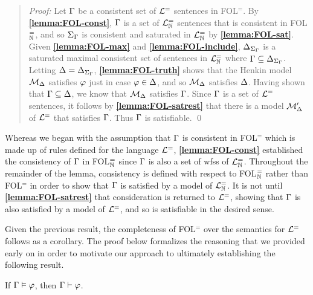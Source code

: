 \begin{quote} 
  \textit{Proof:} 
  Let $\Gamma$ be a consistent set of $\mathcal{L}^{=}$ sentences in FOL$^=$.
  By \textbf{\ref{lemma:FOL-const}}, $\Gamma$ is a set of $\mathcal{L}^{=}_{\mathbb{N}}$ sentences that is consistent in FOL$^=_{\mathbb{N}}$, and so $\Sigma_{\Gamma}$ is consistent and saturated in $\mathcal{L}^{=}_{\mathbb{N}}$ by \textbf{\ref{lemma:FOL-sat}}. 
  Given \textbf{\ref{lemma:FOL-max}} and \textbf{\ref{lemma:FOL-include}}, $\Delta_{\Sigma_{\Gamma}}$ is a saturated maximal consistent set of sentences in $\mathcal{L}^{=}_{\mathbb{N}}$ where $\Gamma\subseteq\Delta_{\Sigma_{\Gamma}}$.
  Letting $\Delta=\Delta_{\Sigma_{\Gamma}}$, \textbf{\ref{lemma:FOL-truth}} shows that the Henkin model $\mathcal{M}_{\Delta}$ satisfies $\varphi$ just in case $\varphi\in\Delta$, and so $\mathcal{M}_{\Delta}$ satisfies $\Delta$.
  Having shown that $\Gamma\subseteq\Delta$, we know that $\mathcal{M}_{\Delta}$ satisfies $\Gamma$.
  Since $\Gamma$ is a set of $\mathcal{L}^{=}$ sentences, it follows by \textbf{\ref{lemma:FOL-satrest}} that there is a model $\mathcal{M}'_{\Delta}$ of $\mathcal{L}^{=}$ that satisfies $\Gamma$.
  Thus $\Gamma$ is satisfiable.
  \qed
\end{quote}

Whereas we began with the assumption that $\Gamma$ is consistent in FOL$^=$ which is made up of rules defined for the language $\mathcal{L}^{=}$, \textbf{\ref{lemma:FOL-const}} established the consistency of $\Gamma$ in FOL$^=_{\mathbb{N}}$ since $\Gamma$ is also a set of wfss of $\mathcal{L}^{=}_{\mathbb{N}}$.
Throughout the remainder of the lemma, consistency is defined with respect to FOL$^=_{\mathbb{N}}$ rather than FOL$^=$ in order to show that $\Gamma$ is satisfied by a model of $\mathcal{L}^{=}_{\mathbb{N}}$. 
It is not until \textbf{\ref{lemma:FOL-satrest}} that consideration is returned to $\mathcal{L}^{=}$, showing that $\Gamma$ is also satisfied by a model of $\mathcal{L}^{=}$, and so is satisfiable in the desired sense.

Given the previous result, the completeness of FOL$^=$ over the semantics for $\mathcal{L}^{=}$ follows as a corollary. 
The proof below formalizes the reasoning that we provided early on in order to motivate our approach to ultimately establishing the following result.



\begin{Cthm}[\sc FOL$^=$ Completeness] \label{cor:FOL-completeness}
  If $\Gamma\vDash\varphi$, then $\Gamma\vdash\varphi$.
\end{Cthm}

